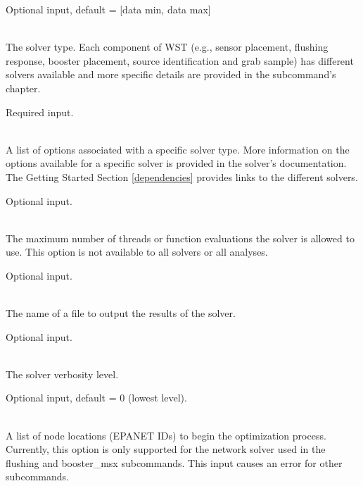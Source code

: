 \begin{description}[topsep=0pt,parsep=0.5em,itemsep=-0.4em]
\begin{description}[topsep=0pt,parsep=0.5em,itemsep=-0.4em]
\begin{description}[topsep=0pt,parsep=0.5em,itemsep=-0.4em]
\begin{description}[topsep=0pt,parsep=0.5em,itemsep=-0.4em]
                Optional input, default = [data min, data max]
      \end{description}
    \end{description}
  \end{description}
  \item[{solver}]\hfill
  \begin{description}[topsep=0pt,parsep=0.5em,itemsep=-0.4em]
    \item[{type}]\hfill
\\The solver type. Each component of WST
				(e.g., sensor placement, flushing response, booster 
				placement, source identification and grab sample) has different 
				solvers available and more specific details are provided in 
				the subcommand's chapter.
                
                Required input.
    \item[{options}]\hfill
\\A list of options associated with a specific solver type. More
            information on the options available for a specific solver
            is provided in the solver's documentation. The Getting
            Started Section \ref{dependencies} provides links to the
            different solvers.
            
            Optional input.
    \item[{threads}]\hfill
\\The maximum number of threads or function evaluations the solver is
                allowed to use.  This option is not available to all solvers or all analyses.
                
                Optional input.
    \item[{logfile}]\hfill
\\The name of a file to output the results of the solver.
                
                Optional input.
    \item[{verbose}]\hfill
\\The solver verbosity level.
                
                Optional input, default = 0 (lowest level).
    \item[{initial points}]\hfill
    \begin{description}[topsep=0pt,parsep=0.5em,itemsep=-0.4em]
      \item[{nodes}]\hfill
\\A list of node locations (EPANET IDs) to begin the optimization
        process. Currently, this option is only supported for the
        network solver used in the flushing and booster\_msx
        subcommands. This input causes an error for other subcommands.
        

\end{description}
\end{description}
\end{description}

